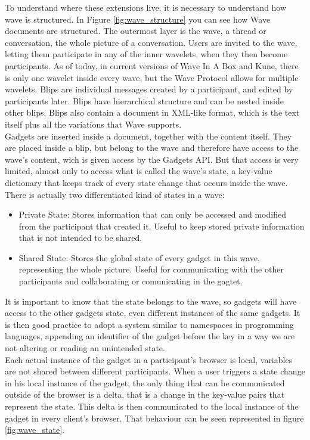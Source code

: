 To understand where these extensions live, it is necessary to understand how wave is structured. In Figure \ref{fig:wave_structure} you can see how Wave documents are structured. The outermost layer is the wave, a thread or conversation, the whole picture of a conversation. Users are invited to the wave, letting them participate in any of the inner wavelets, when they then become participants. As of today, in current versions of Wave In A Box and Kune, there is only one wavelet inside every wave, but the Wave Protocol allows for multiple wavelets. Blips are individual messages created by a participant, and edited by participants later. Blips have hierarchical structure and can be nested inside other blips. Blips also contain a document in XML-like format, which is the text itself plus all the variations that Wave supports.\\[.2cm]
Gadgets are inserted inside a document, together with the content itself. They are placed inside a blip, but belong to the wave and therefore have access to the wave's content, wich is given access by the Gadgets API. But that access is very limited, almost only to access what is called the wave's state, a key-value dictionary that keeps track of every state change that occurs inside the wave.\\[.2cm]
There is actually two differentiated kind of states in a wave:
\begin{itemize}
  \item Private State: Stores information that can only be accessed and modified from the participant that created it. Useful to keep stored private information that is not intended to be shared.
  \item Shared State: Stores the global state of every gadget in this wave, representing the whole picture. Useful for communicating with the other participants and collaborating or comunicating in the gagtet.
\end{itemize}
It is important to know that the state belongs to the wave, so gadgets will have access to the other gadgets state, even different instances of the same gadgets. It is then good practice to adopt a system similar to namespaces in programming languages, appending an identifier of the gadget before the key in a way we are not altering or reading an unintended state.\\[.2cm]
Each actual instance of the gadget in a participant's browser is local, variables are not shared between different participants. When a user triggers a state change in his local instance of the gadget, the only thing that can be communicated outside of the browser is a delta, that is a change in the key-value pairs that represent the state. This delta is then communicated to the local instance of the gadget in every client's browser. That behaviour can be seen represented in figure \ref{fig:wave_state}.
